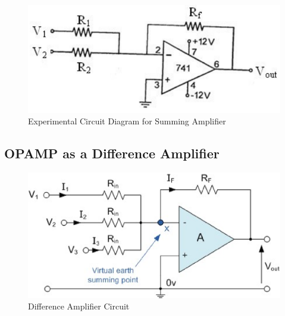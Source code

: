 
\begin{figure}[H]
    \centering
    \includegraphics[width=0.8\columnwidth]{images/sum2.png}
    \caption{Experimental Circuit Diagram for Summing Amplifier}
    \label{sum2}
\end{figure}

\subsection{OPAMP as a Difference Amplifier}

\begin{figure}[H]
    \centering
    \includegraphics[width=0.8\columnwidth]{images/sum1.png}
    \caption{Difference Amplifier Circuit}
    \label{diff1}
\end{figure}

